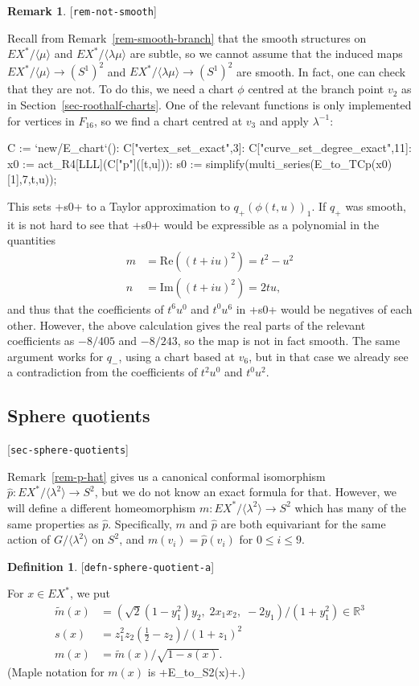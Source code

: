 \documentclass[reqno]{amsart}
\newcommand{\lbl}[1]{\label{#1}\textup{[\texttt{#1}]}\par}
\newcommand{\lbl}{\label}
\newcommand{\lm}        {\lambda}
\newcommand{\R}         {{\mathbb{R}}}
\newcommand{\ip}[1]     {\langle #1\rangle}
\newcommand{\half}      {\tfrac{1}{2}}
\newcommand{\rt}        {\sqrt{2}}
\newcommand{\mt}	{\widetilde{m}}
\newcommand{\hp}        {\widehat{p}}
\renewcommand{\:}{\colon}
\theoremstyle{definition}
\newtheorem{remark}[theorem]{Remark}
\newtheorem{definition}[theorem]{Definition}
\begin{document}
\begin{remark}\lbl{rem-not-smooth}
 Recall from Remark~\ref{rem-smooth-branch} that the smooth structures
 on $EX^*/\ip{\mu}$ and $EX^*/\ip{\lm\mu}$ are subtle, so we cannot
 assume that the induced maps $EX^*/\ip{\mu}\to(S^1)^2$ and
 $EX^*/\ip{\lm\mu}\to(S^1)^2$ are smooth.  In fact, one can check that
 they are not.  To do this, we need a chart $\phi$ centred at the
 branch point $v_2$ as in Section~\ref{sec-roothalf-charts}.  One of
 the relevant functions is only implemented for vertices in $F_{16}$, so
 we find a chart centred at $v_3$ and apply $\lm^{-1}$:
 \begin{mcodeblock}
   C := `new/E_chart`():
   C["vertex_set_exact",3]:
   C["curve_set_degree_exact",11]:
   x0 := act_R4[LLL](C["p"]([t,u])):
   s0 := simplify(multi_series(E_to_TCp(x0)[1],7,t,u));
 \end{mcodeblock}
 This sets \mcode+s0+ to a Taylor approximation to $q_+(\phi(t,u))_1$.
 If $q_+$ was smooth, it is not hard to see that \mcode+s0+ would be
 expressible as a polynomial in the quantities
 \begin{align*}
   m &= \text{Re}((t+iu)^2) = t^2 - u^2 \\
   n &= \text{Im}((t+iu)^2) = 2tu,
 \end{align*}
 and thus that the coefficients of $t^6u^0$ and $t^0u^6$ in \mcode+s0+
 would be negatives of each other.  However, the above calculation
 gives the real parts of the relevant coefficients as $-8/405$ and
 $-8/243$, so the map is not in fact smooth.  The same argument works
 for $q_-$, using a chart based at $v_6$, but in that case we already
 see a contradiction from the coefficients of $t^2u^0$ and $t^0u^2$.
\end{remark}

\subsection{Sphere quotients}
\lbl{sec-sphere-quotients}

Remark~\ref{rem-p-hat} gives us a canonical conformal isomorphism
$\hp\:EX^*/\ip{\lm^2}\to S^2$, but we do not know an exact formula for
that.  However, we will define a different homeomorphism
$m\:EX^*/\ip{\lm^2}\to S^2$ which has many of the same properties as
$\hp$.  Specifically, $m$ and $\hp$ are both equivariant for the same
action of $G/\ip{\lm^2}$ on $S^2$, and $m(v_i)=\hp(v_i)$ for
$0\leq i\leq 9$.

\begin{definition}\lbl{defn-sphere-quotient-a}
 For $x\in EX^*$, we put
 \begin{align*}
  \mt(x) &= \left(\rt (1-y_1^2)y_2,\;2x_1x_2,\;-2y_1\right)/
              (1+y_1^2)\in\R^3 \\
  s(x) &= z_1^2z_2(\half-z_2)/(1+z_1)^2 \\
  m(x) &= \mt(x)/\sqrt{1-s(x)}.
 \end{align*}
 (Maple notation for $m(x)$ is \mcode+E_to_S2(x)+.)
\end{definition}
\end{document}
